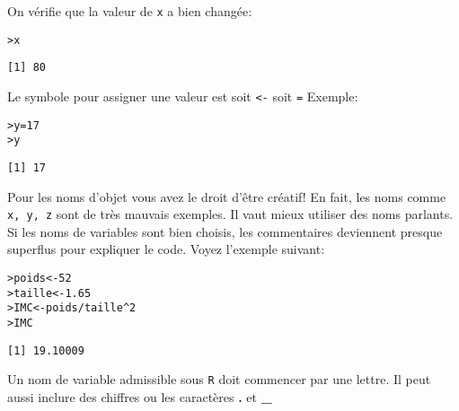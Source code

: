 \documentclass[11pt]{article}
\makeatletter
\numberwithin{equation}{section}
\theoremstyle{remark}
\newenvironment{kframe}{%
 \def\at@end@of@kframe{}%
 \ifinner\ifhmode%
  \def\at@end@of@kframe{\end{minipage}}%
  \begin{minipage}{\columnwidth}%
 \fi\fi%
 \def\FrameCommand##1{\hskip\@totalleftmargin \hskip-\fboxsep
 \colorbox{shadecolor}{##1}\hskip-\fboxsep
     \hskip-\linewidth \hskip-\@totalleftmargin \hskip\columnwidth}%
 \MakeFramed {\advance\hsize-\width
   \@totalleftmargin\z@ \linewidth\hsize
   \@setminipage}}%
 {\par\unskip\endMakeFramed%
 \at@end@of@kframe}
\newenvironment{knitrout}{}{}
\newcommand{\hlnum}[1]{\textcolor[rgb]{0.43,0.21,0.1}{#1}}%
\newcommand{\hlopt}[1]{\textcolor[rgb]{0,0,0}{#1}}%
\newcommand{\hlstd}[1]{\textcolor[rgb]{0,0.2,0.4}{#1}}%
\newcommand{\hlkwb}[1]{\textcolor[rgb]{0.69,0.353,0.396}{#1}}%
\makeatother
\begin{document}
On vérifie que la valeur de \texttt{x} a bien changée:
\begin{knitrout}
\color{fgcolor}\begin{kframe}
\begin{alltt}
\hlstd{> }\hlstd{x}
\end{alltt}
\begin{verbatim}
[1] 80
\end{verbatim}
\end{kframe}
\end{knitrout}
Le symbole pour assigner une valeur est soit \texttt{<-} soit \texttt{=} Exemple:
\begin{knitrout}
\color{fgcolor}\begin{kframe}
\begin{alltt}
\hlstd{> }\hlstd{y} \hlkwb{=} \hlnum{17}
\hlstd{> }\hlstd{y}
\end{alltt}
\begin{verbatim}
[1] 17
\end{verbatim}
\end{kframe}
\end{knitrout}

Pour les  noms d'objet vous avez le droit d'être créatif! En fait, les noms comme \texttt{x, y, z} sont de très mauvais exemples. Il vaut mieux utiliser des noms parlants. Si les noms de variables sont bien choisis, les commentaires deviennent presque superflus pour expliquer le code. Voyez l'exemple suivant:
\begin{knitrout}
\color{fgcolor}\begin{kframe}
\begin{alltt}
\hlstd{> }\hlstd{poids} \hlkwb{<-} \hlnum{52}
\hlstd{> }\hlstd{taille} \hlkwb{<-} \hlnum{1.65}
\hlstd{> }\hlstd{IMC} \hlkwb{<-} \hlstd{poids}\hlopt{/}\hlstd{taille}\hlopt{^}\hlnum{2}
\hlstd{> }\hlstd{IMC}
\end{alltt}
\begin{verbatim}
[1] 19.10009
\end{verbatim}
\end{kframe}
\end{knitrout}
Un nom de variable admissible sous \texttt{R} doit commencer par une lettre. Il peut aussi inclure des chiffres ou les caractères {\bf .} et {\bf \_}
\end{document}
